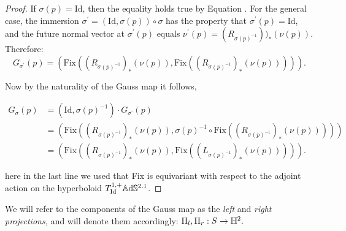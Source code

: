     \begin{proof}
        If $\sigma(p)=\text{Id}$, then the equality holds true by Equation . For the general case, the immersion $\sigma^{\prime} =(\text{Id},\sigma(p))\circ\sigma$ has the property that $\sigma^{\prime}(p)=\text{Id}$, and the future normal vector at $\sigma^{\prime} (p)$ equals $\nu^{\prime} (p)=(R_{\sigma(p)^{-1}}))_{\ast} (\nu(p))$. Therefore: 
        \[
            G_{\sigma^{\prime} }(p)=(\text{Fix}((R_{\sigma(p)^{-1}})_{\ast} (\nu(p)),\text{Fix}((R_{\sigma(p)^{-1}})_{\ast} (\nu(p))))).
        \]

        Now by the naturality of the Gauss map it follows, 
        
        \begin{align*}
            G_\sigma(p)&=(\text{Id},\sigma(p)^{-1})\cdot G_{\sigma^{\prime}}(p) \\
            &=(\text{Fix}((R_{\sigma(p)^{-1}})_{\ast} (\nu(p)),\sigma(p)^{-1}\circ\text{Fix}((R_{\sigma(p)^{-1}})_{\ast} (\nu(p))))) \\
            &=(\text{Fix}((R_{\sigma(p)^{-1}})_{\ast} (\nu(p)),\text{Fix}((L_{\sigma(p)^{-1}})_{\ast} (\nu(p))))).
        \end{align*}
        
        here in the last line we used that Fix is equivariant with respect to the adjoint action on the hyperboloid $T_{\text{Id}}^{1,+}\mathbb{A}\mathrm{d}\mathbb{S}^{2.1}$.
        
    \end{proof}

    We will refer to the components of the Gauss map as the \textit{left} and \textit{right projections,} and will denote them accordingly: $\Pi_{l},\Pi_{r}:S\to\mathbb{H}^2.$\\



